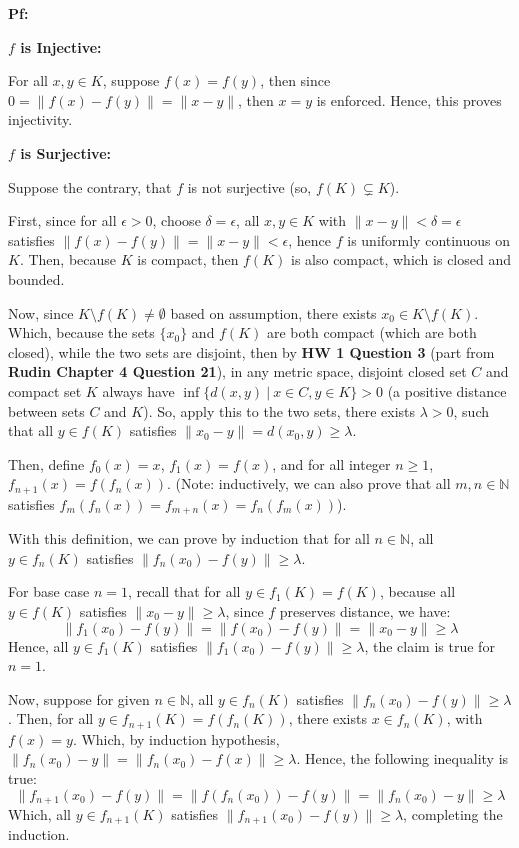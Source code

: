 \documentclass{article}
\begin{document}
\textbf{Pf:}

\textbf{$f$ is Injective:}

For all $x,y\in K$, suppose $f(x)=f(y)$, then since $0=\|f(x)-f(y)\|=\|x-y\|$, then $x=y$ is enforced. Hence, this proves injectivity.

\hfil

\textbf{$f$ is Surjective:}

Suppose the contrary, that $f$ is not surjective (so, $f(K)\subsetneq K$).

First, since for all $\epsilon>0$, choose $\delta=\epsilon$, all $x,y\in K$ with $\|x-y\|<\delta=\epsilon$ satisfies $\|f(x)-f(y)\|=\|x-y\|<\epsilon$,
hence $f$ is uniformly continuous on $K$. Then, because $K$ is compact, then $f(K)$ is also compact, which is closed and bounded.

Now, since $K\setminus f(K)\neq \emptyset$ based on assumption, there exists $x_0\in K\setminus f(K)$. Which, because the sets $\{x_0\}$ and $f(K)$ are both compact (which are both closed),
while the two sets are disjoint, then by \textbf{HW 1 Question 3} (part from \textbf{Rudin Chapter 4 Question 21}), in any metric space,
disjoint closed set $C$ and compact set $K$ always have $\inf\{d(x,y)\ |\ x\in C,y\in K\}>0$ (a positive distance between sets $C$ and $K$).
So, apply this to the two sets, there exists $\lambda>0$, such that all $y\in f(K)$ satisfies $\|x_0-y\| = d(x_0,y) \geq \lambda$.

\hfil

Then, define $f_0(x)=x$, $f_1(x)=f(x)$, and for all integer $n\geq 1$, $f_{n+1}(x)=f(f_n(x))$. 
(Note: inductively, we can also prove that all $m,n\in\mathbb{N}$ satisfies $f_m(f_n(x))=f_{m+n}(x) = f_n(f_m(x))$).

With this definition, we can prove by induction that for all $n\in\mathbb{N}$,
all $y\in f_{n}(K)$ satisfies $\|f_n(x_0)-f(y)\|\geq \lambda$.

For base case $n=1$, recall that for all $y\in f_1(K) = f(K)$, because all $y\in f(K)$ satisfies $\|x_0-y\|\geq \lambda$, since $f$ preserves distance, we have:
$$\|f_1(x_0)-f(y)\| =\|f(x_0)-f(y)\| = \|x_0-y\| \geq \lambda$$
Hence, all $y\in f_1(K)$ satisfies $\|f_1(x_0)-f(y)\|\geq \lambda$, the claim is true for $n=1$.

Now, suppose for given $n\in\mathbb{N}$, all $y\in f_{n}(K)$ satisfies $\|f_n(x_0)-f(y)\|\geq \lambda$.
Then, for all $y\in f_{n+1}(K) = f(f_n(K))$, there exists $x\in f_n(K)$, with $f(x)=y$. Which, by induction hypothesis, $\|f_n(x_0)-y\|=\|f_n(x_0)-f(x)\| \geq \lambda$. 
Hence, the following inequality is true:
$$\|f_{n+1}(x_0)-f(y)\| = \|f(f_n(x_0))-f(y)\| = \|f_n(x_0)-y\| \geq \lambda$$
Which, all $y\in f_{n+1}(K)$ satisfies $\|f_{n+1}(x_0)-f(y)\|\geq \lambda$, completing the induction.
\end{document}
